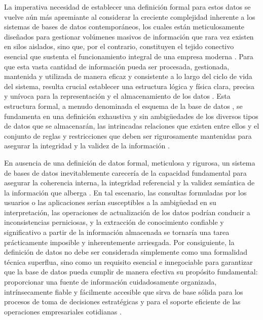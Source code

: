 La imperativa necesidad de establecer una definición formal para estos datos se vuelve aún más apremiante al considerar la creciente complejidad inherente a los sistemas de bases de datos contemporáneos, los cuales están meticulosamente diseñados para gestionar volúmenes masivos de información que rara vez existen en silos aislados, sino que, por el contrario, constituyen el tejido conectivo esencial que sustenta el funcionamiento integral de una empresa moderna \cite{Fundamentos-de-Sistemas-de-Bases-de-Datos}. Para que esta vasta cantidad de información pueda ser procesada, gestionada, mantenida y utilizada de manera eficaz y consistente a lo largo del ciclo de vida del sistema, resulta crucial establecer una estructura lógica y física clara, precisa y unívoca para la representación y el almacenamiento de los datos \cite{Fundamentos-de-Sistemas-de-Bases-de-Datos}. Esta estructura formal, a menudo denominada el esquema de la base de datos \cite{Fundamentos-de-Sistemas-de-Bases-de-Datos, FBD_1}, se fundamenta en una definición exhaustiva y sin ambigüedades de los diversos tipos de datos que se almacenarán, las intrincadas relaciones que existen entre ellos y el conjunto de reglas y restricciones que deben ser rigurosamente mantenidas para asegurar la integridad y la validez de la información \cite{Fundamentos-de-Sistemas-de-Bases-de-Datos}.

En ausencia de una definición de datos formal, meticulosa y rigurosa, un sistema de bases de datos inevitablemente carecería de la capacidad fundamental para asegurar la coherencia interna, la integridad referencial y la validez semántica de la información que alberga \cite{Fundamentos-de-Sistemas-de-Bases-de-Datos}. En tal escenario, las consultas formuladas por los usuarios o las aplicaciones serían susceptibles a la ambigüedad en su interpretación, las operaciones de actualización de los datos podrían conducir a inconsistencias perniciosas, y la extracción de conocimiento confiable y significativo a partir de la información almacenada se tornaría una tarea prácticamente imposible y inherentemente arriesgada. Por consiguiente, la definición de datos no debe ser considerada simplemente como una formalidad técnica superflua, sino como un requisito esencial e innegociable para garantizar que la base de datos pueda cumplir de manera efectiva su propósito fundamental: proporcionar una fuente de información cuidadosamente organizada, intrínsecamente fiable y fácilmente accesible que sirva de base sólida para los procesos de toma de decisiones estratégicas y para el soporte eficiente de las operaciones empresariales cotidianas \cite{Fundamentos-de-Sistemas-de-Bases-de-Datos}.

